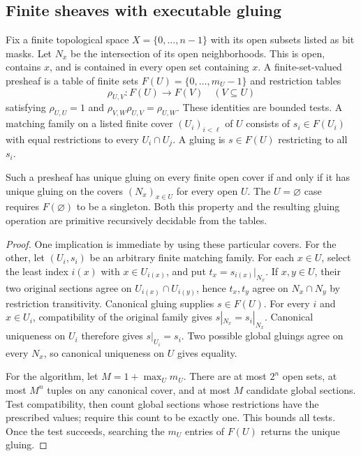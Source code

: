 \subsection{Finite sheaves with executable gluing}

Fix a finite topological space $X=\{0,\ldots,n-1\}$ with its open subsets
listed as bit masks.  Let $N_x$ be the intersection of its open
neighborhoods.  This is open, contains $x$, and is contained in every
open set containing $x$.  A finite-set-valued presheaf is a table of
finite sets $F(U)=\{0,\ldots,m_U-1\}$ and restriction tables
\[
 \rho_{U,V}:F(U)\longrightarrow F(V)\quad(V\subseteq U)
\]
satisfying $\rho_{U,U}=1$ and
$\rho_{V,W}\rho_{U,V}=\rho_{U,W}$.  These identities are bounded tests.
A matching family on a listed finite cover $(U_i)_{i<\ell}$ of $U$
consists of $s_i\in F(U_i)$ with equal restrictions to every
$U_i\cap U_j$.  A gluing is $s\in F(U)$ restricting to all $s_i$.

\begin{theorem}
\label{thm:canonical-sheaf}
Such a presheaf has unique gluing on every finite open cover if and only
if it has unique gluing on the covers $(N_x)_{x\in U}$ for every open
$U$.  The $U=\varnothing$ case requires $F(\varnothing)$ to be a
singleton.  Both this property and the resulting gluing operation are
primitive recursively decidable from the tables.
\end{theorem}
\begin{proof}
One implication is immediate by using these particular covers.  For the
other, let $(U_i,s_i)$ be an arbitrary finite matching family.  For each
$x\in U$, select the least index $i(x)$ with $x\in U_{i(x)}$, and put
$t_x=s_{i(x)}|_{N_x}$.  If $x,y\in U$, their two original sections agree
on $U_{i(x)}\cap U_{i(y)}$, hence $t_x,t_y$ agree on
$N_x\cap N_y$ by restriction transitivity.  Canonical gluing supplies
$s\in F(U)$.  For every $i$ and $x\in U_i$, compatibility of the original
family gives $s|_{N_x}=s_i|_{N_x}$.  Canonical uniqueness on $U_i$
therefore gives $s|_{U_i}=s_i$.  Two possible global gluings agree on
every $N_x$, so canonical uniqueness on $U$ gives equality.

For the algorithm, let $M=1+\max_U m_U$.  There are at most $2^n$ open
sets, at most $M^n$ tuples on any canonical cover, and at most $M$
candidate global sections.  Test compatibility, then count global
sections whose restrictions have the prescribed values; require this
count to be exactly one.  This bounds all tests.  Once the test succeeds,
searching the $m_U$ entries of $F(U)$ returns the unique gluing.
\end{proof}

